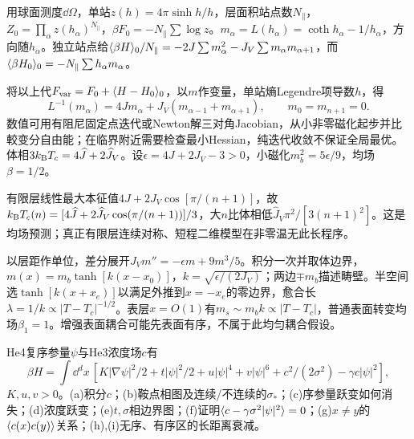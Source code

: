 \begin{solution}
用球面测度$\dd\Omega$，单站$z(h)=4\pi\sinh h/h$，层面积站点数$N_\parallel$，$Z_0=\prod_\alpha z(h_\alpha)^{N_\parallel}$，$\beta F_0=-N_\parallel\sum\log z$。$m_\alpha=L(h_\alpha)=\coth h_\alpha-1/h_\alpha$，方向随$h_\alpha$。独立站点给$\langle \beta H\rangle_0/N_\parallel=-2J\sum m_\alpha^2-J_V\sum m_\alpha m_{\alpha+1}$，而$\langle \beta H_0\rangle_0=-N_\parallel\sum h_\alpha m_\alpha$。

将以上代$F_{\rm var}=F_0+\langle H-H_0\rangle_0$，以$m$作变量，单站熵Legendre项导数$h$，得
\begin{equation}
L^{-1}(m_\alpha)=4Jm_\alpha+J_V(m_{\alpha-1}+m_{\alpha+1}),\qquad m_0=m_{n+1}=0.
\end{equation}
数值可用有阻尼固定点迭代或Newton解三对角Jacobian，从小非零磁化起步并比較变分自由能；在临界附近需要检查最小Hessian，纯迭代收敛不保证全局最优。体相$3k_{\mathrm B} T_c=4\widehat J+2\widehat J_V$。设$\epsilon=4J+2J_V-3>0$，小磁化$m_b^2=5\epsilon/9$，均场$\beta=1/2$。

有限层线性最大本征值$4J+2J_V\cos[\pi/(n+1)]$，故$k_{\mathrm B} T_c(n)=[4\widehat J+2\widehat J_V\cos(\pi/(n+1))]/3$，大$n$比体相低$\widehat J_V\pi^2/[3(n+1)^2]$。这是均场预测；真正有限层连续对称、短程二维模型在非零温无此长程序。

以层距作单位，差分展开$J_Vm''=-\epsilon m+9m^3/5$。积分一次并取体边界，$m(x)=m_b\tanh[k(x-x_0)]$，$k=\sqrt{\epsilon/(2J_V)}$；两边$\mp m_b$描述畴壁。半空间选$\tanh[k(x+x_e)]$以满足外推到$x=-x_e$的零边界，愈合长$\lambda=1/k\propto|T-T_c|^{-1/2}$。表层$x=O(1)$有$m_s\sim m_b k\propto|T-T_c|$，普通表面转变均场$\beta_1=1$。增强表面耦合可能先表面有序，不属于此均匀耦合假设。
\end{solution}
\begin{exercise}[原题3(a)--(i)]\label{p:334-1-3}
He4复序参量$\psi$与He3浓度场$c$有
\begin{equation}
\beta H=\int\dd^dx\,[K|\nabla\psi|^2/2+t|\psi|^2/2+u|\psi|^4+v|\psi|^6+c^2/(2\sigma^2)-\gamma c|\psi|^2],
\end{equation}
$K,u,v>0$。(a)积分$c$；(b)鞍点相图及连续/不连续的$\sigma_*$；(c)序参量跃变如何消失；(d)浓度跃变；(e)$t,\sigma$相边界图；(f)证明$\langle c-\gamma\sigma^2|\psi|^2\rangle=0$；(g)$x\ne y$的$\langle c(x)c(y)\rangle$关系；(h),(i)无序、有序区的长距离衰减。
\end{exercise}
